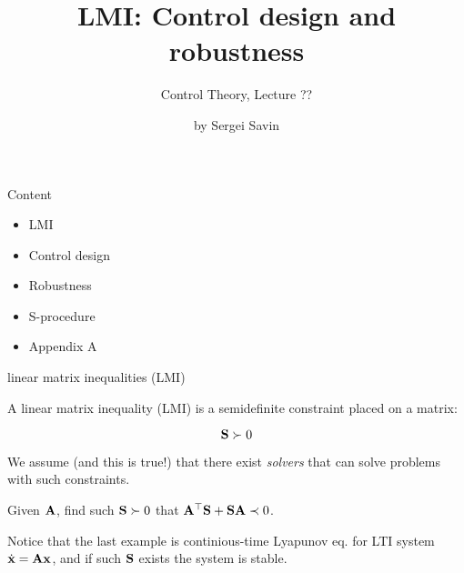 \documentclass{beamer}
\title{LMI: Control design and robustness}
\subtitle{Control Theory, Lecture ??}
\author{by Sergei Savin}
\date{\mydate}
\begin{document}
\maketitle



\begin{frame}{Content}
\begin{itemize}
\item LMI
\item Control design
\item Robustness
\item S-procedure
\item Appendix A
\end{itemize}
\end{frame}




\begin{frame}{linear matrix inequalities (LMI)}
\begin{flushleft}

A linear matrix inequality (LMI) is a semidefinite constraint placed on a matrix:

\begin{equation}
\mathbf{S} \succ 0
\end{equation}

We assume (and this is true!) that there exist \emph{solvers} that can solve problems with such constraints. 


\begin{example}
	Given $\mathbf{A}$, find such $\mathbf{S}\succ 0$ that $\mathbf{A}^\top\mathbf{S} + \mathbf{S}\mathbf{A} \prec 0$.
\end{example}

Notice that the last example is continious-time Lyapunov eq. for LTI system $\dot{\mathbf{x}} = \mathbf{A}\mathbf{x}$, and if such $\mathbf{S}$ exists the system is stable. 

\end{flushleft}
\end{frame}
\end{document}
